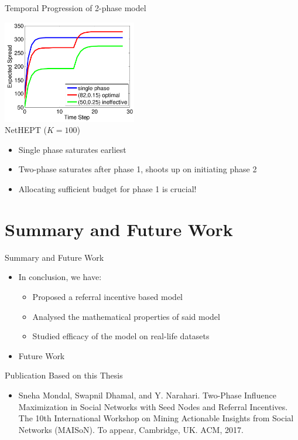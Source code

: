 \documentclass{beamer}
\begin{document}
\begin{frame}{Temporal Progression of 2-phase model}
  \begin{center}
    \includegraphics[height = 4.5cm]{time_lapse_cropped.pdf}
    \\
    {  NetHEPT ($K = 100$)}
  \end{center}
  \begin{itemize}
  \item Single phase saturates earliest
  \item Two-phase saturates after phase 1, shoots up on initiating phase 2
  \item Allocating sufficient budget for phase 1 is crucial!
  \end{itemize}
\end{frame}

\section{Summary and Future Work}

\begin{frame}{Summary and Future Work}
  \begin{itemize}
  \item In conclusion, we have:
  \begin{itemize}
  \item Proposed a referral incentive based model
  \item Analysed the mathematical properties of said model
  \item Studied efficacy of the model on real-life datasets
  \end{itemize}
  \pause
  \item{Future Work}
  \end{itemize}
\end{frame}

\begin{frame}{Publication Based on this Thesis}
  \begin{itemize}
  \item
  Sneha Mondal, Swapnil Dhamal, and Y. Narahari. Two-Phase Influence Maximization in Social Networks with Seed Nodes and Referral Incentives. \\
  \vspace{3mm}
  The 10th International Workshop on Mining Actionable Insights from Social Networks (MAISoN). To appear, Cambridge, UK. ACM, 2017.
  \end{itemize}
\end{frame}
\end{document}
